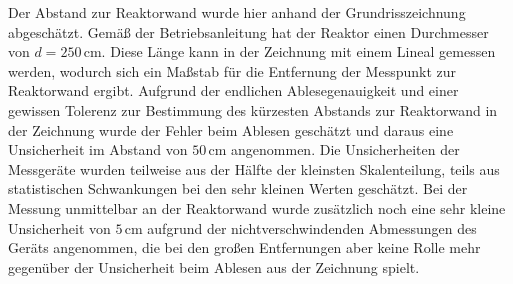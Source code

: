 \documentclass[german,  %
parskip=full,  %
]{scrartcl}
\begin{document}
Der Abstand zur Reaktorwand wurde hier anhand der Grundrisszeichnung abgeschätzt. Gemäß der Betriebsanleitung hat der Reaktor einen Durchmesser von \(d=250\,\mathrm{cm}\). Diese Länge kann in der Zeichnung mit einem Lineal gemessen werden, wodurch sich ein Maßstab für die Entfernung der Messpunkt zur Reaktorwand ergibt. Aufgrund der endlichen Ablesegenauigkeit und einer gewissen Tolerenz zur Bestimmung des kürzesten Abstands zur Reaktorwand in der Zeichnung wurde der Fehler beim Ablesen geschätzt und daraus eine Unsicherheit im Abstand von \(50\,\mathrm{cm}\) angenommen. Die Unsicherheiten der Messgeräte wurden teilweise aus der Hälfte der kleinsten Skalenteilung, teils aus statistischen Schwankungen bei den sehr kleinen Werten geschätzt. Bei der Messung unmittelbar an der Reaktorwand wurde zusätzlich noch eine sehr kleine Unsicherheit von \(5\,\mathrm{cm}\) aufgrund der nichtverschwindenden Abmessungen des Geräts angenommen, die bei den großen Entfernungen aber keine Rolle mehr gegenüber der Unsicherheit beim Ablesen aus der Zeichnung spielt.  
\end{document}
